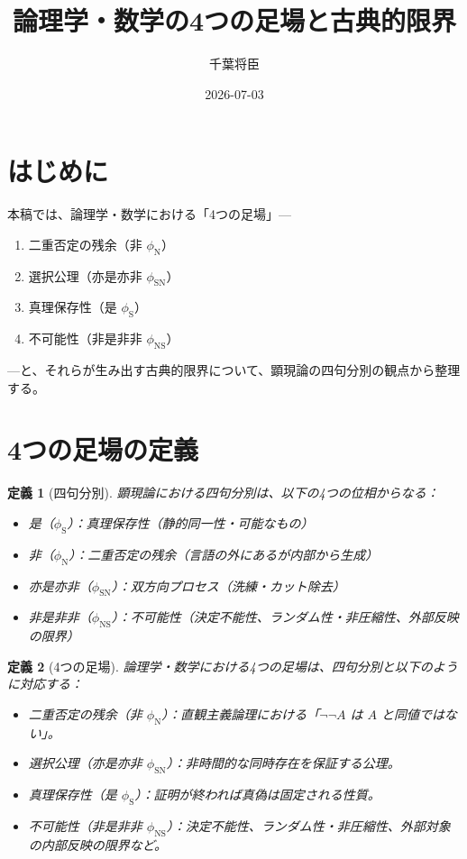 \documentclass[11pt,a4paper]{ltjsarticle}
\title{論理学・数学の4つの足場と古典的限界}
\author{千葉将臣}
\date{2026-07-03}
\newtheorem{definition}{定義}
\newcommand{\phiS}{\phi_{\text{S}}}
\newcommand{\phiN}{\phi_{\text{N}}}
\newcommand{\phiSN}{\phi_{\text{SN}}}
\newcommand{\phiNS}{\phi_{\text{NS}}}
\begin{document}
\maketitle

\section{はじめに}

本稿では、論理学・数学における「4つの足場」---
\begin{enumerate}[label=(\arabic*)]
  \item 二重否定の残余（非 $\phiN$）
  \item 選択公理（亦是亦非 $\phiSN$）
  \item 真理保存性（是 $\phiS$）
  \item 不可能性（非是非非 $\phiNS$）
\end{enumerate}
---と、それらが生み出す古典的限界について、顕現論の四句分別の観点から整理する。

\section{4つの足場の定義}

\begin{definition}[四句分別]
  顕現論における四句分別は、以下の4つの位相からなる：
  \begin{itemize}
    \item 是（$\phiS$）：真理保存性（静的同一性・可能なもの）
    \item 非（$\phiN$）：二重否定の残余（言語の外にあるが内部から生成）
    \item 亦是亦非（$\phiSN$）：双方向プロセス（洗練・カット除去）
    \item 非是非非（$\phiNS$）：不可能性（決定不能性、ランダム性・非圧縮性、外部反映の限界）
  \end{itemize}
\end{definition}

\begin{definition}[4つの足場]
  論理学・数学における4つの足場は、四句分別と以下のように対応する：
  \begin{itemize}
    \item 二重否定の残余（非 $\phiN$）：直観主義論理における「$\neg\neg A$ は $A$ と同値ではない」。
    \item 選択公理（亦是亦非 $\phiSN$）：非時間的な同時存在を保証する公理。
    \item 真理保存性（是 $\phiS$）：証明が終われば真偽は固定される性質。
    \item 不可能性（非是非非 $\phiNS$）：決定不能性、ランダム性・非圧縮性、外部対象の内部反映の限界など。
  \end{itemize}
\end{definition}
\end{document}
